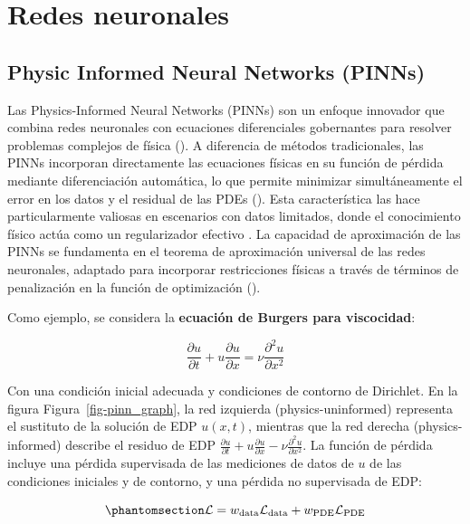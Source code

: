\documentclass[
  spanish,
  us-letterpaper,
  DIV=11,
  numbers=noendperiod]{scrreprt}
\theoremstyle{definition}
\theoremstyle{plain}
\theoremstyle{remark}
\begin{document}
\part{Redes neuronales}

\chapter{Physic Informed Neural Networks
(PINNs)}\label{physic-informed-neural-networks-pinns}

Las Physics-Informed Neural Networks (PINNs) son un enfoque innovador
que combina redes neuronales con ecuaciones diferenciales gobernantes
para resolver problemas complejos de física
(). A diferencia de
métodos tradicionales, las PINNs incorporan directamente las ecuaciones
físicas en su función de pérdida mediante diferenciación automática, lo
que permite minimizar simultáneamente el error en los datos y el
residual de las PDEs (). Esta característica las hace particularmente valiosas en
escenarios con datos limitados, donde el conocimiento físico actúa como
un regularizador efectivo . La capacidad de aproximación de las PINNs se
fundamenta en el teorema de aproximación universal de las redes
neuronales, adaptado para incorporar restricciones físicas a través de
términos de penalización en la función de optimización
().

Como ejemplo, se considera la \textbf{ecuación de Burgers para
viscocidad}:

\[
\frac{\partial u}{\partial t} + u \frac{\partial u}{\partial x} = \nu \frac{\partial^2 u}{\partial x^2}
\]

Con una condición inicial adecuada y condiciones de contorno de
Dirichlet. En la figura Figura~\ref{fig-pinn_graph}, la red izquierda
(physics-\hspace{0pt}uninformed) representa el sustituto de la solución
de EDP \(u(x, t)\), mientras que la red derecha
(physics-\hspace{0pt}informed) describe el residuo de EDP
\(\frac{\partial u}{\partial t} + u \frac{\partial u}{\partial x} - \nu \frac{\partial^2 u}{\partial x^2}\).
La función de pérdida incluye una pérdida supervisada de las mediciones
de datos de \(u\) de las condiciones iniciales y de contorno, y una
pérdida no supervisada de EDP:

\begin{equation}\phantomsection\label{eq-loss-funct}{
\mathcal{L} = w_{\text{data}} \mathcal{L}_{\text{data}} + w_{\text{PDE}} \mathcal{L}_{\text{PDE}}
}\end{equation}
\end{document}
